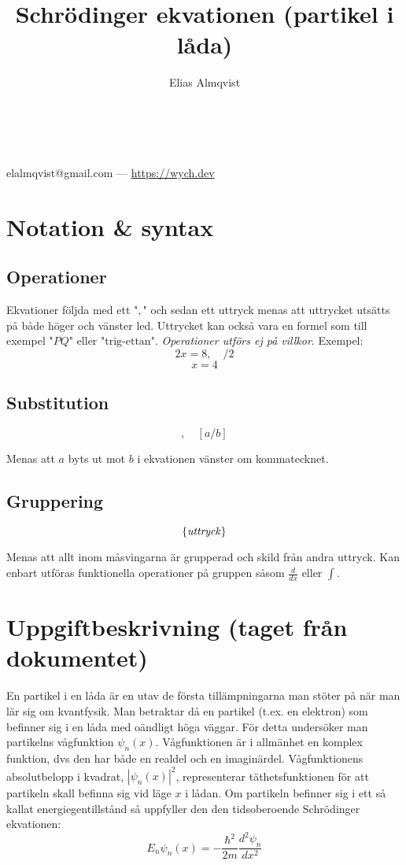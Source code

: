 \documentclass{article}
\makeatletter
\renewcommand{\maketitle}{
	\begin{center}
		{\huge\bfseries\thetitle}\\
		\vspace{1em}
		{\Large\theauthor} \\
		\vspace{1em}
		elalmqvist@gmail.com --- \url{https://wych.dev}
	\end{center}
}
\newcommand{\wavefun}{\psi_n(x)}
\newcommand{\shrodequ}{E_n \psi_n(x) = - \frac{\hbar^2}{2m} \frac{d^2 \psi_n}{dx^2}}
\newcommand{\shrodprob}{|\psi_n(x)|^2}
\makeatother
\begin{document}
\title{Schrödinger ekvationen (partikel i låda)}
\author{Elias Almqvist}

\maketitle
\newpage

\section{Notation \& syntax}
\subsection{Operationer}
Ekvationer följda med ett "$,$" och sedan ett uttryck menas att uttrycket utsätts på både höger och vänster led. Uttrycket kan också vara en formel som till exempel "$PQ$" eller "$\text{trig-ettan}$". \emph{Operationer utförs ej på villkor}. Exempel:
$$
2x = 8, \quad /2
$$
$$
x = 4
$$

\subsection{Substitution}
$$
, \quad \left[ a / b \right]
$$

Menas att $a$ byts ut mot $b$ i ekvationen vänster om kommatecknet.

\subsection{Gruppering}
$$
\left\{\text{\emph{uttryck}}\right\}
$$

Menas att allt inom måsvingarna är grupperad och skild från andra uttryck. Kan enbart utföras funktionella operationer på gruppen såsom $\frac{d}{dx}$ eller $\int$.

\newpage
\section{Uppgiftbeskrivning (taget från dokumentet)}
En partikel i en låda är en utav de första tillämpningarna man stöter på när man lär sig om kvantfysik. Man betraktar då en partikel (t.ex. en elektron) som befinner sig i en låda med oändligt höga väggar.
För detta undersöker man partikelns vågfunktion $\wavefun$. Vågfunktionen är i allmänhet en komplex funktion,
dvs den har både en realdel och en imaginärdel. Vågfunktionens absolutbelopp i kvadrat, $\shrodprob$, representerar täthetsfunktionen för att partikeln skall befinna sig vid läge $x$ i lådan. Om partikeln befinner sig i ett så
kallat energiegentillstånd så uppfyller den den tidsoberoende Schrödinger ekvationen:
\begin{equation} \label{shrodequ}
	\shrodequ
\end{equation}
\end{document}
